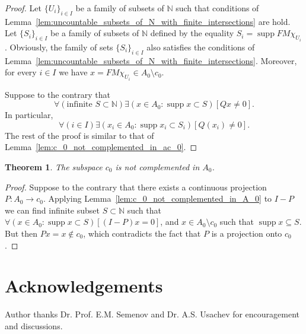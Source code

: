 \documentclass[a4paper,14pt]{article} %
\DeclareMathOperator{\supp}{supp}
\theoremstyle{plain}
\newtheorem{theorem}{Theorem}[section]
\theoremstyle{definition}
\begin{document}
\begin{proof}
	Let $\{U_i\}_{i \in I}$ be a family of subsets of $\mathbb{N}$
	such that conditions of Lemma~\ref{lem:uncountable_subsets_of_N_with_finite_intersections} are hold.
	Let $\{S_i\}_{i \in I}$ be a family of subsets of $\mathbb{N}$
	defined by the equality $S_i = \supp FM\chi_{U_i}$.
	Obviously, the family of sets $\{S_i\}_{i \in I}$ also
	satisfies the conditions of Lemma~\ref{lem:uncountable_subsets_of_N_with_finite_intersections}.
	Moreover, for every $i\in I$ we have $x = FM\chi_{U_i} \in A_0\setminus c_0$.

	Suppose to the contrary that
	\begin{equation}
		\forall(\mbox{infinite }S\subset\mathbb{N})\exists(x \in A_0 : \supp x \subset S)[Qx \neq 0]
		.
	\end{equation}
	In particular,
	\begin{equation}
		\forall(i\in I)\exists(x_i \in A_0 : \supp x_i \subset S_i)[Q(x_i) \neq 0]
		.
	\end{equation}
	The rest of the proof is similar to that of Lemma~\ref{lem:c_0_not_complemented_in_ac_0}.

\end{proof}

\begin{theorem}
	The subspace $c_0$ is not complemented in $A_0$.
\end{theorem}

\begin{proof}
	Suppose to the contrary that
	there exists a continuous projection $P: A_0 \to c_0$.
	Applying Lemma~\ref{lem:c_0_not_complemented_in_A_0} to $I-P$
	we can find infinite subset $S\subset\mathbb{N}$
	such that $\forall(x\in A_0 : \supp x \subset S)[(I-P)x = 0]$,
	and $x\in A_0 \setminus c_0$ such that $\supp x \subseteq S$.
	But then $Px = x\notin c_0$,
	which contradicts  the fact  that $P$ is a projection onto $c_0$.
\end{proof}


\section{Acknowledgements}
Author thanks Dr. Prof. E.M. Semenov and Dr. A.S. Usachev for encouragement and discussions.


\end{document}
